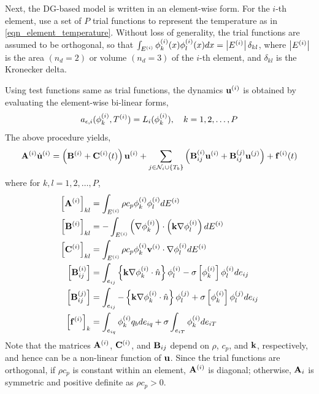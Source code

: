 Next, the DG-based model is written in an element-wise form. For the $i$-th element, use a set of $P$ trial functions to represent the temperature as in \cref{eqn_element_temperature}. Without loss of generality, the trial functions are assumed to be orthogonal, so that $\int_{E^{(i)}} \phi^{(i)}_k(x) \phi^{(i)}_l(x) dx = \left|E^{(i)}\right|\delta_{kl}$, where $\left|E^{(i)}\right|$ is the area $(n_d=2)$ or volume $(n_d=3)$ of the $i$-th element, and $\delta_{kl}$ is the Kronecker delta.

Using test functions same as trial functions, the dynamics $\mathbf{u}^{(i)}$ is obtained by evaluating the element-wise bi-linear forms,
\begin{equation}
    a_{\epsilon,i}(\phi_k^{(i)},T^{(i)}) = L_i(\phi_k^{(i)}),\quad k=1,2,\dots,P
\end{equation}
The above procedure yields,
\begin{equation}
    \mathbf{A}^{(i)}\dot{\mathbf{u}}^{(i)} = \left(\mathbf{B}^{(i)} + \mathbf{C}^{(i)}(t)\right)\mathbf{u}^{(i)} + \sum_{j\in\mathcal{N}_i\cup\left\{T_b\right\}}\left(\mathbf{B}^{(i)}_{ij}\mathbf{u}^{(i)} + \mathbf{B}^{(j)}_{ij}\mathbf{u}^{(j)}\right) + \mathbf{f}^{(i)}(t)\label{eqn_element_wise_model}
\end{equation}
where for $k,l=1,2,\dots,P$,
\begin{subequations}
    \begin{align}
        \left[\mathbf{A}^{(i)}\right]_{kl} &= \int_{E^{(i)}}\rho c_p\phi_k^{(i)}\phi_l^{(i)}dE^{(i)}\\
        \left[\mathbf{B}^{(i)}\right]_{kl} &= -\int_{E^{(i)}}\left(\nabla\phi_k^{(i)}\right)\cdot\left(\mathbf{k}\nabla\phi_l^{(i)}\right)dE^{(i)}\\
        \left[\mathbf{C}^{(i)}\right]_{kl} &= \int_{E^{(i)}}\rho c_p \phi_k^{(i)}\mathbf{v}^{(i)}\cdot\nabla\phi_l^{(i)}dE^{(i)}\\
        \left[\mathbf{B}^{(i)}_{ij}\right] &= \int_{e_{ij}}\left\{\mathbf{k}\nabla\phi_k^{(i)}\cdot\hat{n}\right\}\phi_l^{(i)} - \sigma\left[\phi_k^{(i)}\right]\phi_l^{(i)}de_{ij}\\
        \left[\mathbf{B}^{(j)}_{ij}\right] &= \int_{e_{ij}}-\left\{\mathbf{k}\nabla\phi_k^{(i)}\cdot\hat{n}\right\}\phi_l^{(j)} + \sigma\left[\phi_k^{(i)}\right]\phi_l^{(j)}de_{ij}\\
        \left[\mathbf{f}^{(i)}\right]_k &= \int_{e_{iq}}\phi_k^{(i)}q_bde_{iq} + \sigma\int_{e_{iT}}\phi_k^{(i)}de_{iT}
    \end{align}
\end{subequations}
Note that the matrices $\mathbf{A}^{(i)}$, $\mathbf{C}^{(i)}$, and $\mathbf{B}_{ij}$ depend on $\rho$, $c_p$, and $\mathbf{k}$, respectively, and hence can be a non-linear function of $\mathbf{u}$. Since the trial functions are orthogonal, if $\rho c_p$ is constant within an element, $\mathbf{A}^{(i)}$ is diagonal; otherwise, $\mathbf{A}_i$ is symmetric and positive definite as $\rho c_p > 0$.

